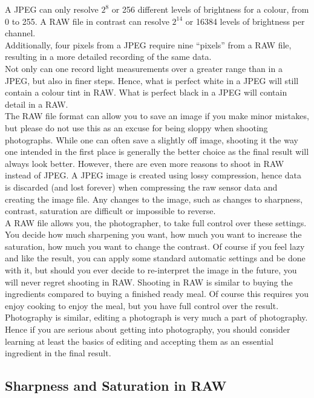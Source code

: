 A \gls{JPEG} can only resolve $2^{8}$ or 256 different levels of brightness for a colour, from 0 to 255. A \gls{RAW} file in contrast can resolve $2^{14}$ or 16384 levels of brightness per channel.
\\
Additionally, four pixels from a \gls{JPEG} require nine ``pixels'' from a \gls{RAW} file, resulting in a more detailed recording of the same data.
\\[\baselineskip]
Not only can one record light measurements over a greater range than in a \gls{JPEG}, but also in finer steps. Hence, what is perfect white in a \gls{JPEG} will still contain a colour tint in \gls{RAW}. What is perfect black in a \gls{JPEG} will contain detail in a \gls{RAW}.
\\[\baselineskip]
The \gls{RAW} file format can allow you to save an image if you make minor mistakes, but please do not use this as an excuse for being sloppy when shooting photographs. While one can often save a slightly off image, shooting it the way one intended in the first place is generally the better choice as the final result will always look better. However, there are even more reasons to shoot in \gls{RAW} instead of \gls{JPEG}. A \gls{JPEG} image is created using lossy compression, hence data is discarded (and lost forever) when compressing the raw \gls{sensor} data and creating the image file. Any changes to the image, such as changes to sharpness, contrast, saturation are difficult or impossible to reverse.
\\[\baselineskip]
A \gls{RAW} file allows you, the photographer, to take full control over these settings. You decide how much sharpening you want, how much you want to increase the saturation, how much you want to change the contrast. Of course if you feel lazy and like the result, you can apply some standard automatic settings and be done with it, but should you ever decide to re-interpret the image in the future, you will never regret shooting in \gls{RAW}. Shooting in \gls{RAW} is similar to buying the ingredients compared to buying a finished ready meal. Of course this requires you enjoy cooking to enjoy the meal, but you have full control over the result. Photography is similar, editing a photograph is very much a part of photography. Hence if you are serious about getting into photography, you should consider learning at least the basics of editing and accepting them as an essential ingredient in the final result.


\subsection{Sharpness and Saturation in RAW}


